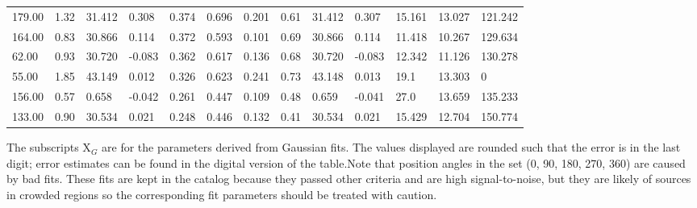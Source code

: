 \begin{table}[htp]
{\begin{tabular}{lllllllllllll}
179.00 & 1.32 & 31.412 & 0.308 & 0.374 & 0.696 & 0.201 & 0.61 & 31.412 & 0.307 & 15.161 & 13.027 & 121.242 \\
164.00 & 0.83 & 30.866 & 0.114 & 0.372 & 0.593 & 0.101 & 0.69 & 30.866 & 0.114 & 11.418 & 10.267 & 129.634 \\
62.00 & 0.93 & 30.720 & -0.083 & 0.362 & 0.617 & 0.136 & 0.68 & 30.720 & -0.083 & 12.342 & 11.126 & 130.278 \\
55.00 & 1.85 & 43.149 & 0.012 & 0.326 & 0.623 & 0.241 & 0.73 & 43.148 & 0.013 & 19.1 & 13.303 & 0 \\
156.00 & 0.57 & 0.658 & -0.042 & 0.261 & 0.447 & 0.109 & 0.48 & 0.659 & -0.041 & 27.0 & 13.659 & 135.233 \\
133.00 & 0.90 & 30.534 & 0.021 & 0.248 & 0.446 & 0.132 & 0.41 & 30.534 & 0.021 & 15.429 & 12.704 & 150.774 \\
\hline
\end{tabular}
}\par
The subscripts X${_G}$ are for the parameters derived from Gaussian fits.  The values displayed are rounded such that the error is in the last digit; error estimates can be found in the digital version of the table.Note that position angles in the set (0, 90, 180, 270, 360) are caused by bad fits.  These fits are kept in the catalog because they passed other criteria and are high signal-to-noise, but they are likely of sources in crowded regions so the corresponding fit parameters should be treated with caution.
\end{table}
